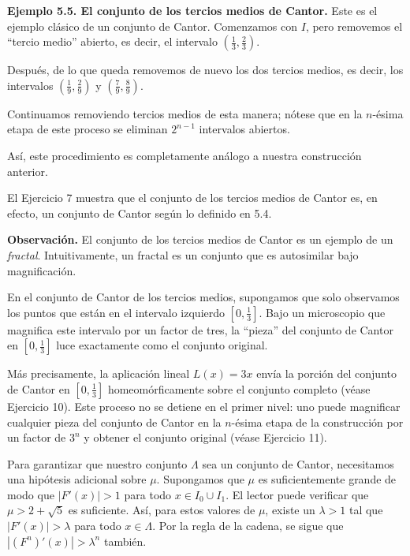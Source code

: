 \documentclass[10pt,a4paper]{book}
\begin{document}
\medskip

\textbf{Ejemplo 5.5. El conjunto de los tercios medios de Cantor.}  
Este es el ejemplo clásico de un conjunto de Cantor.  
Comenzamos con $I$, pero removemos el “tercio medio” abierto, es decir, el intervalo 
\(\left(\tfrac{1}{3},\tfrac{2}{3}\right)\).  

Después, de lo que queda removemos de nuevo los dos tercios medios, es decir, los intervalos 
\(\left(\tfrac{1}{9},\tfrac{2}{9}\right)\) y \(\left(\tfrac{7}{9},\tfrac{8}{9}\right)\).  

Continuamos removiendo tercios medios de esta manera; nótese que en la $n$-ésima etapa de este proceso 
se eliminan $2^{n-1}$ intervalos abiertos.  

Así, este procedimiento es completamente análogo a nuestra construcción anterior.  

El Ejercicio 7 muestra que el conjunto de los tercios medios de Cantor es, en efecto, un conjunto de Cantor 
según lo definido en 5.4.

\newpage

\textbf{Observación.}  
El conjunto de los tercios medios de Cantor es un ejemplo de un \emph{fractal}.  
Intuitivamente, un fractal es un conjunto que es autosimilar bajo magnificación.  

En el conjunto de Cantor de los tercios medios, supongamos que solo observamos los puntos que están 
en el intervalo izquierdo $[0,\tfrac{1}{3}]$. Bajo un microscopio que magnifica este intervalo por un factor de tres, la “pieza” del conjunto de Cantor en $[0,\tfrac{1}{3}]$ luce exactamente como el conjunto original.  

Más precisamente, la aplicación lineal $L(x)=3x$ envía la porción del conjunto de Cantor en $[0,\tfrac{1}{3}]$ homeomórficamente sobre el conjunto completo (véase Ejercicio 10). Este proceso no se detiene en el primer nivel: uno puede magnificar cualquier pieza del conjunto de Cantor en la $n$-ésima etapa de la construcción por un factor de $3^{n}$ y obtener el conjunto original (véase Ejercicio 11).

\medskip

Para garantizar que nuestro conjunto $\Lambda$ sea un conjunto de Cantor, necesitamos una hipótesis adicional 
sobre $\mu$. Supongamos que $\mu$ es suficientemente grande de modo que $|F'(x)|>1$ para todo $x\in I_{0}\cup I_{1}$.  
El lector puede verificar que $\mu>2+\sqrt{5}$ es suficiente. Así, para estos valores de $\mu$, existe un $\lambda>1$ tal que $|F'(x)|>\lambda$ para todo $x\in\Lambda$. Por la regla de la cadena, se sigue que $|(F^{n})'(x)|>\lambda^{n}$ también.  
\end{document}
